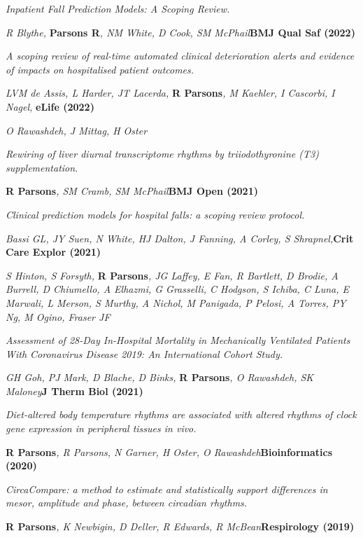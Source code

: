 	\textit{Inpatient Fall Prediction Models: A Scoping Review.}
\item
	\textit{R Blythe, }\textbf{Parsons R}\textit{, NM White, D Cook, SM McPhail}\textbf{\hfill{BMJ Qual Saf (2022)}}\par
	\textit{A scoping review of real-time automated clinical deterioration alerts and evidence of impacts on hospitalised patient outcomes.}
\item
	\textit{LVM de Assis, L Harder, JT Lacerda, }\textbf{R Parsons}\textit{, M Kaehler, I Cascorbi, I Nagel, }\textbf{\hfill eLife (2022)}\par
	\textit{O Rawashdeh, J Mittag, H Oster}\par
    \textit{Rewiring of liver diurnal transcriptome rhythms by triiodothyronine (T3) supplementation.}
\item
    \textbf{R Parsons}\textit{, SM Cramb, SM McPhail}\textbf{\hfill BMJ Open (2021)}\par 
    \textit{Clinical prediction models for hospital falls: a scoping review protocol.}
\item
    \textit{Bassi GL, JY Suen, N White, HJ Dalton, J Fanning, A Corley, S Shrapnel,}\textbf{\hfill Crit Care Explor (2021)}\par
	\textit{S Hinton, S Forsyth, }\textbf{R Parsons}\textit{, JG Laffey, E Fan, R Bartlett, D Brodie, A Burrell, D Chiumello, A Elhazmi, G Grasselli, C Hodgson, S Ichiba, C Luna, E Marwali, L Merson, S Murthy, A Nichol, M Panigada, P Pelosi, A Torres, PY Ng, M Ogino, Fraser JF}\par
    \textit{Assessment of 28-Day In-Hospital Mortality in Mechanically Ventilated Patients With Coronavirus Disease 2019: An International Cohort Study.}
\item
    \textit{GH Goh, PJ Mark, D Blache, D Binks, }\textbf{R Parsons}\textit{, O Rawashdeh, SK Maloney}\textbf{\hfill J Therm Biol (2021)}\par 
    \textit{Diet-altered body temperature rhythms are associated with altered rhythms of clock gene expression in peripheral tissues in vivo.}
\item
    \textbf{R Parsons}\textit{, R Parsons, N Garner, H Oster, O Rawashdeh}\textbf{\hfill Bioinformatics (2020)}\par 
    \textit{CircaCompare: a method to estimate and statistically support differences in mesor, amplitude and phase, between circadian rhythms.}
\item
    \textbf{R Parsons}\textit{, K Newbigin, D Deller, R Edwards, R McBean}\textbf{\hfill Respirology (2019)}\par 
